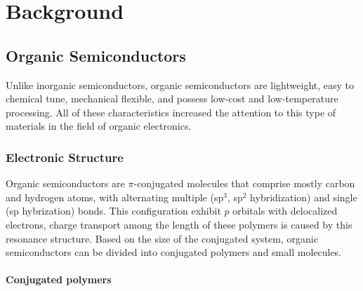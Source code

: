 {\chapter{Background}}
\label{sec:background}

\section{Organic Semiconductors}

Unlike inorganic semiconductors, organic semiconductors are lightweight, easy to chemical tune, mechanical flexible, and possess low-cost and low-temperature processing. All of these characteristics increased the attention to this type of materials in the field of organic electronics. 


\subsection{Electronic Structure}

Organic semiconductors are $\pi$-conjugated molecules that comprise mostly carbon and hydrogen atoms, with alternating multiple (sp$^{3}$, sp$^{2}$ hybridization) and single (sp hybrization) bonds. This configuration exhibit $p$ orbitals with delocalized electrons, charge transport among the length of these polymers is caused by this resonance structure. 
Based on the size of the conjugated system, organic semiconductors can be divided into conjugated polymers and small molecules.

\subsubsection{Conjugated polymers}

